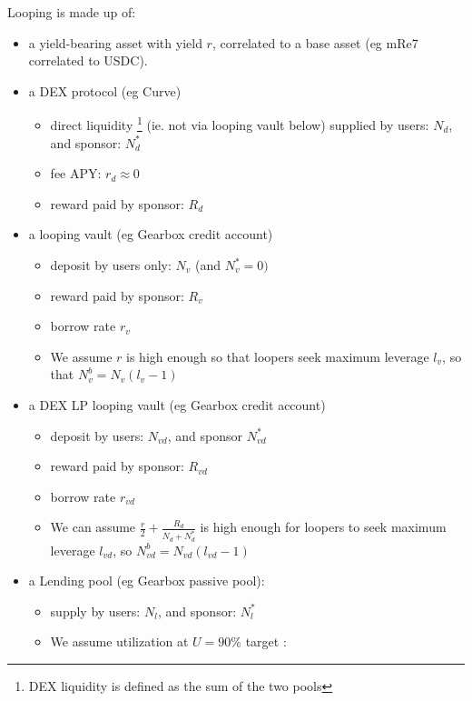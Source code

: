 \documentclass{article}
\begin{document}
Looping is made up of:
    \begin{itemize}
        \item a yield-bearing asset with yield $r$, correlated to a base asset (eg mRe7 correlated to USDC).
        \item a DEX protocol (eg Curve)
        \begin{itemize}
            \item direct liquidity
            \footnote{DEX liquidity is defined as the sum of the two pools}
            (ie. not via looping vault below) supplied by users: $N_d$, and sponsor: $N_d^*$ 
            \item fee APY: $r_d\approx 0$
            \item reward paid by sponsor: $R_d$
        \end{itemize}
        \item a looping vault (eg Gearbox credit account)
        \begin{itemize}
            \item deposit by users only: $N_v$ (and $N_v^*=0)$
            \item reward paid by sponsor: $R_v$
            \item borrow rate $r_v$
            \item We assume $r$ is high enough so that loopers seek maximum leverage $l_v$, 
            so that $N_v^b=N_v(l_v-1)$
        \end{itemize}
        \item a DEX LP looping vault (eg Gearbox credit account)
        \begin{itemize}
            \item deposit by users: $N_{vd}$, and sponsor $N_{vd}^*$
            \item reward paid by sponsor: $R_{vd}$
            \item borrow rate $r_{vd}$
            \item We can assume $\frac{r}{2}+\frac{R_d}{N_d+N_d^*}$ is high enough for loopers to seek maximum leverage $l_{vd}$, 
            so $N_{vd}^b = N_{vd}(l_{vd}-1)$
        \end{itemize}
        \item a Lending pool (eg Gearbox passive pool):
        \begin{itemize}
            \item supply by users: $N_l$, and sponsor: $N_l^*$
            \item We assume utilization at $U=90\%$ target : 

\end{itemize}
\end{itemize}
\end{document}
